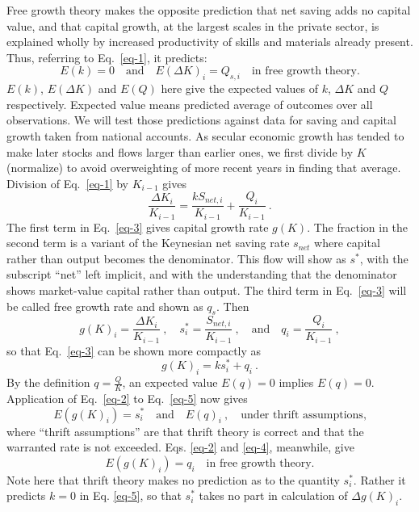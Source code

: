 \documentclass[a4paper,fleqn]{latex_styles/cas-sc}
\begin{document}
Free growth theory makes the opposite prediction that net saving adds no capital value, and that capital growth, at the largest scales in the private sector, is explained wholly by increased productivity of skills and materials already present. Thus, referring to Eq.~\eqref{eq-1}, it predicts:
%
\begin{equation}
    E(k) = 0 \quad \text{and} \quad E(\Delta K)_i = Q_{s,i} \quad \text{in free growth theory.} \label{eq-3}
\end{equation}
%
\(E(k)\), \(E(\Delta K)\) and \(E(Q)\) here give the expected values of \(k\), \(\Delta K\)
and \(Q\) respectively. Expected value means predicted average of outcomes
over all observations.
We will test those predictions against data for saving and capital growth taken from national accounts.
As secular economic growth has tended to make
later stocks and flows larger than earlier ones, we first divide by
\(K\) (normalize) to avoid overweighting of more recent years in finding
that average. Division of Eq.~\eqref{eq-1} by \(K_{i - 1}\) gives
%
\begin{equation}
    \frac{{\Delta K}_{i}}{K_{i - 1}} = \frac{k S_{net,i}}{K_{i - 1}} + \frac{Q_{i}}{K_{i - 1}} \ .\label{eq-4}
\end{equation}
%
The first term in Eq.~\eqref{eq-3} gives capital growth rate \(g(K)\). The fraction in the second term is a
variant of the Keynesian net saving rate \(s_{net}\) where capital
rather than output becomes the denominator. This flow will show 
as \(s^{*}\), with the subscript ``net''
left implicit, and with the understanding that the denominator shows
market-value capital rather than output.
The third term in Eq.~\eqref{eq-3} will be called free growth rate and
shown as \(q_s\). Then
%
\[g{(K)}_{i} = \frac{\Delta K_{i}}{K_{i - 1}} \ , \quad
s^{*}_{i} = \frac{S_{net,i}}{K_{i - 1}} \ , \quad \text{and} \quad
q_{i} = \frac{Q_{i}}{K_{i - 1}} \ ,\]
%
so that Eq.~\eqref{eq-3} can be shown more compactly as
%
\begin{equation}
g(K)_{i} = k s^{*}_{i} + q_{i} \ .\label{eq-5}
\end{equation}
%
By the definition \(q = \frac{Q}{K}\), an expected value \(E(q) = 0\)
implies \(E(q) = 0\). Application of Eq.~\eqref{eq-2} to
Eq.~\eqref{eq-5} now gives
%
\begin{equation}
    E(g(K)_i) = s^*_i \quad \text{and} \quad E(q)_i\ , \quad \text{under thrift assumptions,}\label{eq-6}
\end{equation}
%
where ``thrift assumptions'' are that thrift theory is correct and that
the warranted rate is not exceeded. Eqs. \eqref{eq-2} and \eqref{eq-4}, meanwhile, give
%
\begin{equation}
    E(g(K)_i) = q_{i} \quad \text{in free growth theory.}\label{eq-7}
\end{equation}
%
Note here that thrift theory makes no prediction as to the quantity \(s^*_i\). Rather it predicts \(k=0\) in Eq. \eqref{eq-5}, so that \(s^*_i\) takes no part in calculation of \(\Delta g(K)_i\).
\end{document}
